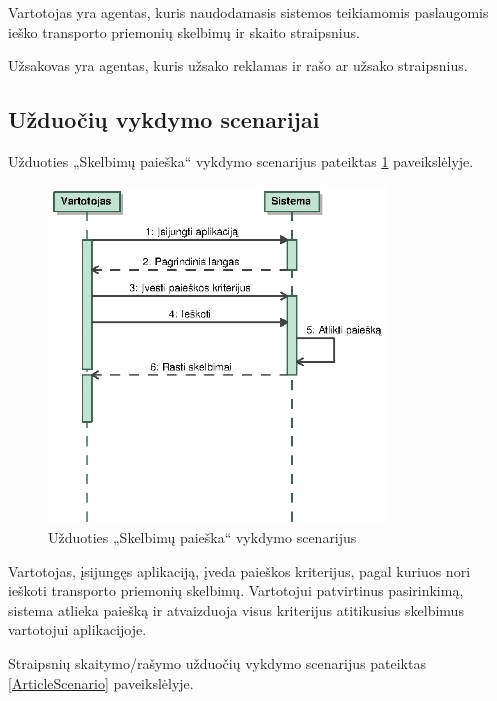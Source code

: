 \documentclass[12pt]{article}
\begin{document}
	Vartotojas yra agentas, kuris naudodamasis sistemos teikiamomis paslaugomis ieško transporto priemonių skelbimų ir skaito straipsnius.
	
	Užsakovas yra agentas, kuris užsako reklamas ir rašo ar užsako straipsnius.
	\pagebreak
	
	\subsection{Užduočių vykdymo scenarijai}
	
	Užduoties „Skelbimų paieška“ vykdymo scenarijus pateiktas \ref{SearchScenario} paveikslėlyje.
	
	\begin{figure}[h]
		\begin{center}
			\includegraphics[width=0.8\textwidth]{PaieskaSeka.eps}
			\caption{Užduoties „Skelbimų paieška“ vykdymo scenarijus\label{SearchScenario}}
		\end{center}
	\end{figure}
	
	Vartotojas, įsijungęs aplikaciją, įveda paieškos kriterijus, pagal kuriuos nori ieškoti transporto priemonių skelbimų. Vartotojui patvirtinus pasirinkimą, sistema atlieka paiešką ir atvaizduoja visus kriterijus atitikusius skelbimus vartotojui aplikacijoje.
	\pagebreak
	
	Straipsnių skaitymo/rašymo užduočių vykdymo scenarijus pateiktas \ref{ArticleScenario} paveikslėlyje.
	
\end{document}
